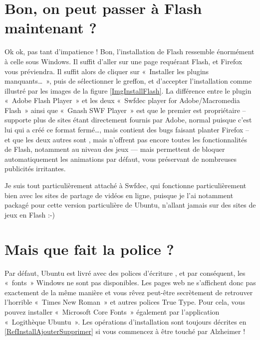 \section{Bon, on peut passer à Flash maintenant ?}
Ok ok, pas tant d'impatience ! Bon, l'installation de Flash ressemble énormément à celle sous Windows. Il suffit d'aller sur une page requérant Flash, et Firefox vous préviendra. Il suffit alors de cliquer sur «~Installer les plugins manquants\ldots{}~», puis de sélectionner le greffon, et d'accepter l'installation comme illustré par les images de la figure \ref{ImgInstallFlash}. La différence entre le plugin «~Adobe Flash Player~» et les deux «~Swfdec player for Adobe/Macromedia Flash~» ainsi que «~Gnash SWF Player~» est que le premier est propriétaire -- supporte plus de sites étant directement fournis par Adobe, normal puisque c'est lui qui a créé ce format fermé\ldots{}, mais contient des bugs faisant planter Firefox -- et que les deux autres sont , mais n'offrent pas encore toutes les fonctionnalités de Flash, notamment au niveau des jeux --- mais permettent de bloquer automatiquement les animations par défaut, vous préservant de nombreuses publicités irritantes.\par
\InstallationFlash
\begin{nota}
Je suis tout particulièrement attaché à Swfdec, qui fonctionne particulièrement bien avec les sites de partage de vidéos en ligne, puisque je l'ai notamment packagé pour cette version particulière de Ubuntu, n'allant jamais sur des sites de jeux en Flash :-)
\end{nota}
\section{Mais que fait la police ?}
Par défaut, Ubuntu est livré avec des polices d'écriture , et par conséquent, les «~fonts~» Windows ne sont pas disponibles. Les pages web ne s'affichent donc pas exactement de la même manière et vous rêvez peut-être secrètement de retrouver l'horrible «~Times New Roman~» et autres polices True Type. Pour cela, vous pouvez installer «~Microsoft Core Fonts~» également par l'application «~Logithèque Ubuntu~». Les opérations d'installation sont toujours décrites en \ref{RefInstallAjouterSupprimer} si vous commencez à être touché par Alzheimer !
